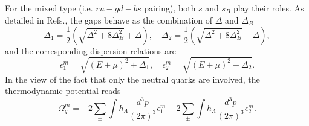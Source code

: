 \documentclass[prd, showpacs,nofootinbib,amsmath,amssymb,12pt]{revtex4}
\begin{document}
For the mixed type (i.e. $ru-gd-bs$ pairing),  both $s$ and $s_B$ play their roles.
As detailed in Refs.\cite{ferrer2006color,noronha2007color},
the  gaps behave as the combination of $\Delta$ and $\Delta_B$
\begin{equation}
\Delta_{1}=\frac{1}{2}(\sqrt{\Delta^2 + 8\Delta_B^2} + \Delta),\quad
\Delta_{2}=\frac{1}{2}(\sqrt{\Delta^2 + 8\Delta_B^2} - \Delta),
\end{equation}
and  the corresponding dispersion relations are 
\begin{equation}
\epsilon^m_1=\sqrt{(E\pm\mu)^2+\Delta_1},\quad \epsilon^m_2=\sqrt{(E\pm\mu)^2+\Delta_2}.
\end{equation}
In the view of the fact that only the neutral quarks are involved, 
the thermodynamic potential reads 
\begin{equation}
\Omega^m_q=-2\sum_{\pm}\int h_{\Lambda}\frac{d^3p}{(2\pi)^3}  \epsilon^m_1 -2\sum_{\pm}\int h_{\Lambda}\frac{d^3p}{(2\pi)^3}  \epsilon^m_2. 
\label{eq:omega_m}
\end{equation}
\end{document}
